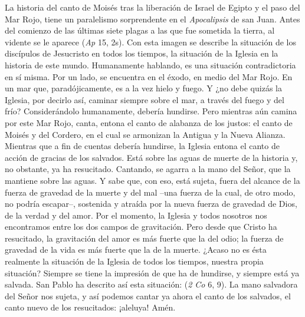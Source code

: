 \begin{body}
La historia del canto de Moisés tras la liberación de Israel de Egipto y el paso del Mar Rojo, tiene un paralelismo sorprendente en el \textit{Apocalipsis} de san Juan. Antes del comienzo de las últimas siete plagas a las que fue sometida la tierra, al vidente se le aparece  (\textit{Ap} 15, 2s). Con esta imagen se describe la situación de los discípulos de Jesucristo en todos los tiempos, la situación de la Iglesia en la historia de este mundo. Humanamente hablando, es una situación contradictoria en sí misma. Por un lado, se encuentra en el éxodo, en medio del Mar Rojo. En un mar que, paradójicamente, es a la vez hielo y fuego. Y ¿no debe quizás la Iglesia, por decirlo así, caminar siempre sobre el mar, a través del fuego y del frío? Considerándolo humanamente, debería hundirse. Pero mientras aún camina por este Mar Rojo, canta, entona el canto de alabanza de los justos: el canto de Moisés y del Cordero, en el cual se armonizan la Antigua y la Nueva Alianza. Mientras que a fin de cuentas debería hundirse, la Iglesia entona el canto de acción de gracias de los salvados. Está sobre las aguas de muerte de la historia y, no obstante, ya ha resucitado. Cantando, se agarra a la mano del Señor, que la mantiene sobre las aguas. Y sabe que, con eso, está sujeta, fuera del alcance de la fuerza de gravedad de la muerte y del mal –una fuerza de la cual, de otro modo, no podría escapar–, sostenida y atraída por la nueva fuerza de gravedad de Dios, de la verdad y del amor. Por el momento, la Iglesia y todos nosotros nos encontramos entre los dos campos de gravitación. Pero desde que Cristo ha resucitado, la gravitación del amor es más fuerte que la del odio; la fuerza de gravedad de la vida es más fuerte que la de la muerte. ¿Acaso no es ésta realmente la situación de la Iglesia de todos los tiempos, nuestra propia situación? Siempre se tiene la impresión de que ha de hundirse, y siempre está ya salvada. San Pablo ha descrito así esta situación:  (\textit{2 Co} 6, 9). La mano salvadora del Señor nos sujeta, y así podemos cantar ya ahora el canto de los salvados, el canto nuevo de los resucitados: ¡aleluya! Amén.
\end{body}

